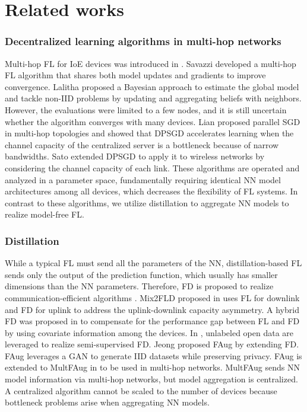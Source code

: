 \documentclass[journal]{IEEEtran}
\begin{document}
\section{Related works} \label{sec:related}
\subsubsection*{Decentralized learning algorithms in multi-hop networks}
Multi-hop \gls{FL} for \gls{IoE} devices was introduced in \cite{lalitha2019peer,savazzi2020federated,lian2017can,sato2020network}.
Savazzi \etal \cite{savazzi2020federated} developed a multi-hop \gls{FL} algorithm that shares both model updates and gradients to improve convergence.
Lalitha \etal \cite{lalitha2019peer} proposed a Bayesian approach to estimate the global model and tackle non-\gls{IID} problems
by updating and aggregating beliefs with neighbors.
However, the evaluations were limited to a few nodes, and it is still uncertain whether the algorithm converges with many devices.
Lian \etal \cite{lian2017can} proposed parallel \gls{SGD} in multi-hop topologies
and showed that \gls{DPSGD} accelerates learning when the channel capacity of the centralized server is a bottleneck because of narrow bandwidths.
Sato \etal \cite{sato2020network} extended \gls{DPSGD} to apply it to wireless networks by considering the channel capacity of each link.
These algorithms are operated and analyzed in a parameter space,
fundamentally requiring identical \gls{NN} model architectures among all devices,
which decreases the flexibility of \gls{FL} systems.
In contrast to these algorithms, we utilize distillation to aggregate \gls{NN} models to realize model-free \gls{FL}.

\subsubsection*{Distillation}
While a typical \gls{FL} must send all the parameters of the \gls{NN},
distillation-based \gls{FL} sends only the output of the prediction function, which usually has smaller dimensions than the \gls{NN} parameters.
Therefore, \gls{FD} is proposed to realize communication-efficient algorithms \cite{oh2020mix2fld,ahn2019wireless,itahara2021distillation,chang2019cronus,jeong2018communication}.
Mix2FLD proposed in \cite{oh2020mix2fld} uses \gls{FL} for downlink and \gls{FD} for uplink to address the uplink-downlink capacity asymmetry.
A hybrid \gls{FD} was proposed in \cite{ahn2019wireless} to compensate for the performance gap between \gls{FL} and \gls{FD} by using covariate information among the devices.
In \cite{itahara2021distillation}, unlabeled open data are leveraged to realize semi-supervised \gls{FD}.
Jeong \etal \cite{jeong2018communication} proposed \gls{FAug} by extending \gls{FD}.
\Gls{FAug} leverages a \gls{GAN} to generate \gls{IID} datasets while preserving privacy.
\Gls{FAug} is extended to MultFAug in \cite{jeong2019multi} to be used in multi-hop networks.
MultFAug sends \gls{NN} model information via multi-hop networks, but model aggregation is centralized.
A centralized algorithm cannot be scaled to the number of devices because bottleneck problems arise when aggregating \gls{NN} models.
\end{document}
